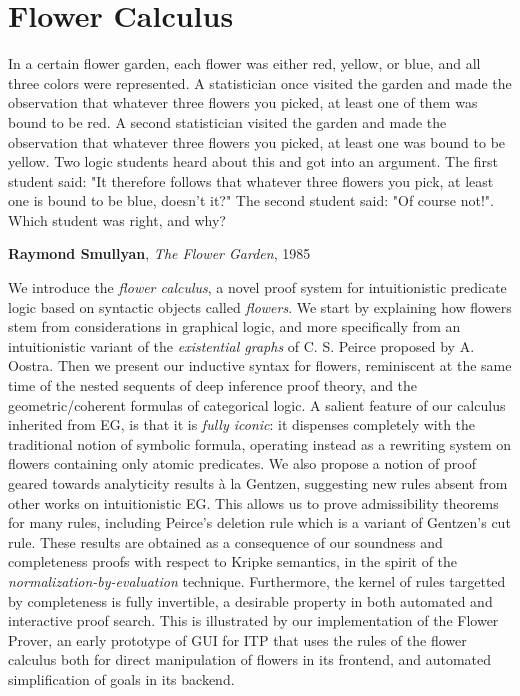 \setchapterpreamble[u]{\margintoc}
\chapter{Flower Calculus}

\epigraph{In a certain flower garden, each flower was either red, yellow, or
blue, and all three colors were represented. A statistician once visited the
garden and made the observation that whatever three flowers you picked, at least
one of them was bound to be red. A second statistician visited the garden and
made the observation that whatever three flowers you picked, at least one was
bound to be yellow. Two logic students heard about this and got into an
argument. The first student said: "It therefore follows that whatever three
flowers you pick, at least one is bound to be blue, doesn't it?" The second
student said: "Of course not!". Which student was right, and why?
}{\textbf{Raymond Smullyan}, \textit{The Flower Garden}, 1985}

We introduce the \emph{flower calculus}, a novel proof system for intuitionistic
predicate logic based on syntactic objects called \emph{flowers}. We start by
explaining how flowers stem from considerations in graphical logic, and more
specifically from an intuitionistic variant of the \emph{existential graphs} of
C. S. Peirce proposed by A. Oostra. Then we present our inductive syntax for
flowers, reminiscent at the same time of the nested sequents of deep inference
proof theory, and the geometric/coherent formulas of categorical logic. A
salient feature of our calculus inherited from EG, is that it is \emph{fully
iconic}: it dispenses completely with the traditional notion of symbolic
formula, operating instead as a rewriting system on flowers containing only
atomic predicates. We also propose a notion of proof geared towards analyticity
results à la Gentzen, suggesting new rules absent from other works on
intuitionistic EG. This allows us to prove admissibility theorems for many
rules, including Peirce's deletion rule which is a variant of Gentzen's cut
rule. These results are obtained as a consequence of our soundness and
completeness proofs with respect to Kripke semantics, in the spirit of the
\emph{normalization-by-evaluation} technique. Furthermore, the kernel of rules
targetted by completeness is fully invertible, a desirable property in both
automated and interactive proof search. This is illustrated by our
implementation of the Flower Prover, an early prototype of GUI for ITP that uses
the rules of the flower calculus both for direct manipulation of flowers in its
frontend, and automated simplification of goals in its backend.

